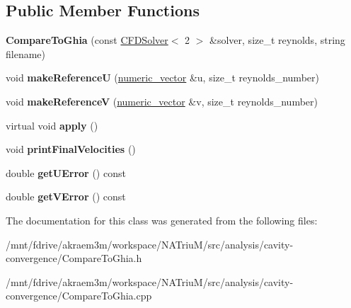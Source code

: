 \subsection*{Public Member Functions}
\begin{DoxyCompactItemize}
\item 
\hypertarget{classnatrium_1_1CompareToGhia_a215a79320645f7e21382bafce52ef40a}{
{\bfseries CompareToGhia} (const \hyperlink{classnatrium_1_1CFDSolver}{CFDSolver}$<$ 2 $>$ \&solver, size\_\-t reynolds, string filename)}
\label{classnatrium_1_1CompareToGhia_a215a79320645f7e21382bafce52ef40a}

\item 
\hypertarget{classnatrium_1_1CompareToGhia_a28dae9c06d3e05a9d382cee62b39b98e}{
void {\bfseries makeReferenceU} (\hyperlink{namespacenatrium_a67c39077adc6634f8fa3762b8eef24c4}{numeric\_\-vector} \&u, size\_\-t reynolds\_\-number)}
\label{classnatrium_1_1CompareToGhia_a28dae9c06d3e05a9d382cee62b39b98e}

\item 
\hypertarget{classnatrium_1_1CompareToGhia_aaa8231947c3cdb2b4c4b47aa1737b37f}{
void {\bfseries makeReferenceV} (\hyperlink{namespacenatrium_a67c39077adc6634f8fa3762b8eef24c4}{numeric\_\-vector} \&v, size\_\-t reynolds\_\-number)}
\label{classnatrium_1_1CompareToGhia_aaa8231947c3cdb2b4c4b47aa1737b37f}

\item 
\hypertarget{classnatrium_1_1CompareToGhia_ac83280b765857fe3205fb3438ce180b1}{
virtual void {\bfseries apply} ()}
\label{classnatrium_1_1CompareToGhia_ac83280b765857fe3205fb3438ce180b1}

\item 
\hypertarget{classnatrium_1_1CompareToGhia_aad8215907a80e774c79b633c4ff51430}{
void {\bfseries printFinalVelocities} ()}
\label{classnatrium_1_1CompareToGhia_aad8215907a80e774c79b633c4ff51430}

\item 
\hypertarget{classnatrium_1_1CompareToGhia_a8cd59b073e13a40ee5794007e643e87c}{
double {\bfseries getUError} () const }
\label{classnatrium_1_1CompareToGhia_a8cd59b073e13a40ee5794007e643e87c}

\item 
\hypertarget{classnatrium_1_1CompareToGhia_a319bbaf313d57dccb333c00de3df5919}{
double {\bfseries getVError} () const }
\label{classnatrium_1_1CompareToGhia_a319bbaf313d57dccb333c00de3df5919}

\end{DoxyCompactItemize}


The documentation for this class was generated from the following files:\begin{DoxyCompactItemize}
\item 
/mnt/fdrive/akraem3m/workspace/NATriuM/src/analysis/cavity-\/convergence/CompareToGhia.h\item 
/mnt/fdrive/akraem3m/workspace/NATriuM/src/analysis/cavity-\/convergence/CompareToGhia.cpp\end{DoxyCompactItemize}

